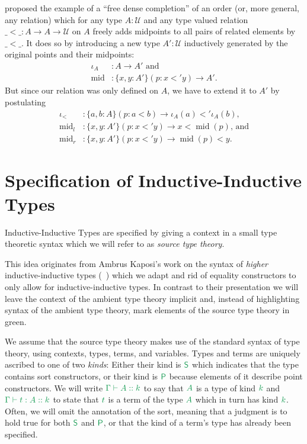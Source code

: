 \documentclass[12pt,headings=optiontohead,openany,oneside,a4paper]{book}
\theoremstyle{definition}
\newcommand{\UU}{\mathcal{U}}
\newcommand{\gr}[1]{{\color{ForestGreen}#1}}
\newcommand{\grm}[1]{\ensuremath{\gr{#1}}}
\newcommand{\Sc}{\mathsf{S}}
\newcommand{\Pc}{\mathsf{P}}
\begin{document}
\begin{example}
\cite{nordvallinductive} proposed the example of a ``free dense completion'' of
an order (or, more general, any relation) which for any type $A : \UU$ and
any type valued relation $\_<\_ : A \to A \to \UU$ on $A$ freely adds midpoints
to all pairs of related elements by $\_<\_$.
It does so by introducing a new type $A' : \UU$ inductively generated by the
original points and their midpoints:
\begin{align*}
\iota_A		&: A \to A' \text{ and} \\
\mathop{mid}	&: \{x, y : A'\}(p : x <' y) \to A' \text{.}
\end{align*}
But since our relation was only defined on $A$, we have to extend it to $A'$ by
postulating
\begin{align*}
\iota_<		&: \{a, b : A\}(p : a < b) \to \iota_A(a) <' \iota_A(b) \text{,} \\
\mathop{mid}_l	&: \{x, y : A'\}(p : x <' y) \to x < \mathop{mid}(p) \text{, and} \\
\mathop{mid}_r	&: \{x, y : A'\}(p : x <' y) \to \mathop{mid}(p) < y \text{.}
\end{align*}
\end{example}

\chapter{Specification of Inductive-Inductive Types}

Inductive-Inductive Types are specified by giving a context in  a small type
theoretic syntax which we will refer to as \emph{source type theory}.

This idea originates from Ambrus Kaposi's work on the syntax of \emph{higher}
inductive-inductive types (~\cite{ambrussyntax}) which we adapt and rid of equality
constructors to only allow for inductive-inductive types.
In contrast to their presentation we will leave the context of the ambient type
theory implicit and, instead of highlighting syntax of the ambient type theory,
mark elements of the source type theory in \gr{green}.

We assume that the source type theory makes use of the standard syntax of type
theory, using contexts, types, terms, and variables.
Types and terms are uniquely ascribed to one of two \emph{kinds}:
Either their kind is \grm{\Sc} which indicates that the type contains sort
constructors, or their kind is \grm{\Pc} because elements of it describe
point constructors.
We will write \grm{\Gamma \vdash A :: k} to say that \grm{A} is a type of kind
\grm{k} and \grm{\Gamma \vdash t : A :: k} to state that \grm{t} is a term of the
type \grm{A} which in turn has kind \grm{k}.
Often, we will omit the annotation of the sort, meaning that a judgment is to
hold true for both \grm{\Sc} and \grm{\Pc}, or that the kind of a term's type
has already been specified.
\end{document}
